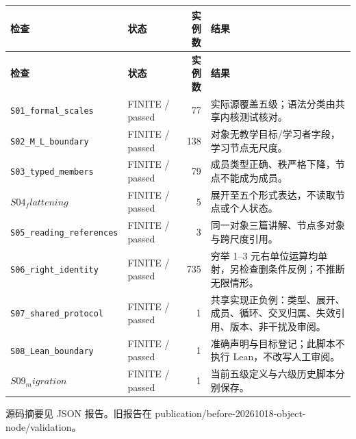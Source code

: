\documentclass[UTF8,a4paper,zihao=-4,fontset=windows,openany]{ctexbook}
\def\mathrm#1{#1}%
\newcommand{\mcsbrk}{\penalty 200\relax}
\begin{document}
\begingroup\small\setlength{\tabcolsep}{4pt}
\begin{longtable}{>{\raggedright\arraybackslash}p{}>{\raggedright\arraybackslash}p{}r>{\raggedright\arraybackslash}p{}}
\toprule
\textbf{检查} & \textbf{状态} & \textbf{实例数} & \textbf{结果} \\
\midrule
\endfirsthead
\toprule
\textbf{检查} & \textbf{状态} & \textbf{实例数} & \textbf{结果} \\
\midrule
\endhead
\bottomrule
\endfoot
\bottomrule
\endlastfoot
\texttt{S01\mcsbrk\_formal\mcsbrk\_scales} & FINITE / passed & 77 & 实际源覆盖五级；语法分类由共享内核测试核对。 \\
\texttt{S02\mcsbrk\_M\mcsbrk\_L\mcsbrk\_boundary} & FINITE / passed & 138 & 对象无教学目标/学习者字段，学习节点无尺度。 \\
\texttt{S03\mcsbrk\_typed\mcsbrk\_members} & FINITE / passed & 79 & 成员类型正确、秩严格下降，节点不能成为成员。 \\
\(S04_\mathrm{flattening}\) & FINITE / passed & 5 & 展开至五个形式表达，不读取节点或个人状态。 \\
\texttt{S05\mcsbrk\_reading\mcsbrk\_references} & FINITE / passed & 3 & 同一对象三篇讲解、节点多对象与跨尺度引用。 \\
\texttt{S06\mcsbrk\_right\mcsbrk\_identity} & FINITE / passed & 735 & 穷举 1–3 元右单位运算均单射，另检查删条件反例；不推断无限情形。 \\
\texttt{S07\mcsbrk\_shared\mcsbrk\_protocol} & FINITE / passed & 1 & 共享实现正负例：类型、展开、成员、循环、交叉归属、失效引用、版本、非干扰及审阅。 \\
\texttt{S08\mcsbrk\_Lean\mcsbrk\_boundary} & FINITE / passed & 1 & 准确声明与目标登记；此脚本不执行 Lean，不改写人工审阅。 \\
\(S09_\mathrm{migration}\) & FINITE / passed & 1 & 当前五级定义与六级历史脚本分别保存。 \\
\end{longtable}
\endgroup

源码摘要见 JSON 报告。旧报告在 publication/before-20261018-object-node/validation。
\end{document}
